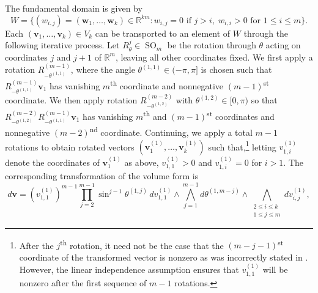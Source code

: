 \documentclass[twoside]{amsart}
\theoremstyle{definition}
\theoremstyle{remark}
\numberwithin{equation}{section}
\newcommand{\R}{\mathbb{R}}
\newcommand{\SO}{\operatorname{SO}}
\begin{document}
The fundamental domain is given by
\begin{equation}
\label{eq:Om_FundDomain}
    W   =   \big\{(w_{i,j}) = (\mathbf{w}_1,\ldots,\mathbf{w}_k)\in\R^{km} :
                w_{i,j} = 0 \text{ if } j > i, \;
                w_{i,i} > 0 \text{ for } 1\leq i\leq m \big\}.
\end{equation}
Each $(\mathbf{v}_1,\ldots,\mathbf{v}_k)\in V_k$ can be transported to an element of $W$ through the following iterative process.
Let $R_\theta^{j}\in\SO_m$ be the rotation through $\theta$ acting on coordinates $j$ and $j+1$ of $\R^m$, leaving all other coordinates fixed.
We first apply a rotation $R_{-\theta^{(1,1)}}^{(m-1)}$, where the angle $\theta^{(1,1)}\in(-\pi,\pi]$ is chosen such that
$R_{-\theta^{(1,1)}}^{(m-1)}\mathbf{v}_1$ has vanishing $m$\textsuperscript{th} coordinate and nonnegative $(m-1)$\textsuperscript{st} coordinate.
We then apply rotation $R_{-\theta^{(1,2)}}^{(m-2)}$ with $\theta^{(1,2)}\in[0,\pi)$ so that
$R_{-\theta^{(1,2)}}^{(m-2)} R_{-\theta^{(1,1)}}^{(m-1)}\mathbf{v}_1$ has vanishing $m$\textsuperscript{th} and $(m-1)$\textsuperscript{st}
coordinates and nonnegative $(m-2)$\textsuperscript{nd} coordinate. Continuing, we apply a total $m-1$ rotations to obtain rotated vectors
$( \mathbf{v}_1^{(1)},\ldots,\mathbf{v}_k^{(1)} )$ such
that,\footnote{After the $j$\textsuperscript{th} rotation, it need not be the case that the
$(m-j-1)$\textsuperscript{st} coordinate of the transformed vector is nonzero as was incorrectly stated in \cite{HerbigSeatonWhitesell}.
However, the linear independence assumption ensures that $v_{1,1}^{(1)}$ will be nonzero after the first sequence of $m-1$ rotations.}
letting $v_{1,i}^{(1)}$ denote the coordinates of $\mathbf{v}_1^{(1)}$ as above, $v_{1,1}^{(1)} > 0$ and $v_{1,i}^{(1)} = 0$ for $i > 1$.
The corresponding transformation of the volume form \cite[pp.~7]{HerbigSeatonWhitesell} is
\[
    d\mathbf{v}
    =
    (v_{1,1}^{(1)})^{m-1} \prod\limits_{j=2}^{m-1} \sin^{j-1}\theta^{(1,j)}
        \, dv_{1,1}^{(1)} \wedge \bigwedge\limits_{j=1}^{m-1} d\theta^{(1,m-j)} \wedge \bigwedge\limits_{\substack{2\leq i\leq k \\ 1\leq j\leq m}} dv_{i,j}^{(1)},
\]
\end{document}
